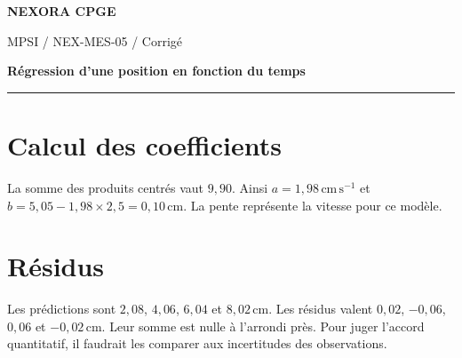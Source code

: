 \documentclass[11pt,a4paper]{article}
\begin{document}
{\small\bfseries\color{nexorablue} NEXORA CPGE}\par
{\small MPSI / NEX-MES-05 / Corrigé}\par
{\LARGE\bfseries Régression d’une position en fonction du temps}\par
\vspace{0.25em}\hrule\vspace{0.6em}

\section*{Calcul des coefficients}
La somme des produits centrés vaut $9{,}90$. Ainsi $a=1{,}98\,\mathrm{cm\,s^{-1}}$ et $b=5{,}05-1{,}98\times2{,}5=0{,}10\,\mathrm{cm}$. La pente représente la vitesse pour ce modèle.

\section*{Résidus}
Les prédictions sont $2{,}08$, $4{,}06$, $6{,}04$ et $8{,}02\,\mathrm{cm}$. Les résidus valent $0{,}02$, $-0{,}06$, $0{,}06$ et $-0{,}02\,\mathrm{cm}$. Leur somme est nulle à l’arrondi près. Pour juger l’accord quantitatif, il faudrait les comparer aux incertitudes des observations.
\end{document}
